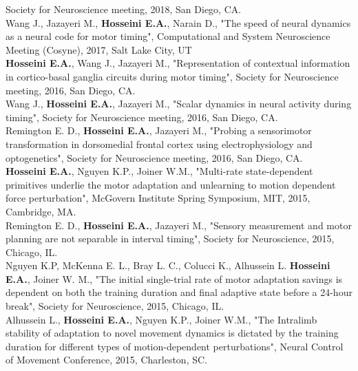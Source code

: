 \documentclass[margin, 10pt]{res}
\begin{document}
\begin{resume}
Society for Neuroscience meeting, 2018, San Diego, CA. \
\vspace{2.5mm} \\
Wang J., Jazayeri M., { \bf Hosseini E.A.}, Narain D., "The speed of neural dynamics as a neural code for motor timing", Computational and System Neuroscience Meeting (Cosyne), 2017, Salt Lake City, UT \
\vspace{2.5mm} \\
{ \bf Hosseini E.A.}, Wang J., Jazayeri M., "Representation of contextual information in cortico-basal ganglia circuits during motor timing",
Society for Neuroscience meeting, 2016, San Diego, CA. \
\vspace{2.5mm} \\
Wang J., { \bf Hosseini E.A.}, Jazayeri M., "Scalar dynamics in neural activity during timing",
Society for Neuroscience meeting, 2016, San Diego, CA. \
\vspace{2.5mm} \\
Remington E. D., { \bf Hosseini E.A.}, Jazayeri M., "Probing a sensorimotor transformation in dorsomedial frontal cortex using electrophysiology and optogenetics",
Society for Neuroscience meeting, 2016, San Diego, CA. \
\vspace{2.5mm} \\
{ \bf Hosseini E.A.}, Nguyen K.P., Joiner W.M., "Multi-rate state-dependent primitives underlie the motor adaptation and unlearning to motion dependent force perturbation", McGovern Institute Spring Symposium, MIT, 2015, Cambridge, MA. \
\vspace{2.5mm} \\
Remington E. D., { \bf Hosseini E.A.}, Jazayeri M., "Sensory measurement and motor planning are not 
separable in interval timing", Society for Neuroscience, 2015, Chicago, IL.\
\vspace{2.5mm} \\
Nguyen K.P, McKenna E. L., Bray L. C., Colucci K., Alhussein L. { \bf Hosseini E.A.},  Joiner W. M., "The initial single-trial rate of motor adaptation savings is dependent on
both the training duration and final adaptive state before a 24-hour break", Society for Neuroscience, 2015, Chicago, IL.\
\vspace{2.5mm} \\
Alhussein L., { \bf Hosseini E.A.}, Nguyen K.P., Joiner W.M., "The Intralimb stability
of adaptation to novel movement dynamics is dictated by the training duration for different types of motion-dependent perturbations", Neural Control of Movement Conference, 2015, Charleston, SC. \

\end{resume}
\end{document}
